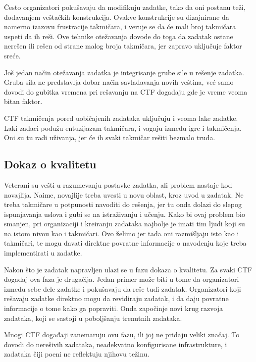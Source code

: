 \documentclass[12pt, a4paper, twocolumn]{article}
\begin{document}
Često organizatori pokušavaju da modifikuju zadatke, tako da oni postanu teži,
dodavanjem veštačkih konstrukcija. Ovakve konstrukcije su dizajnirane da 
namerno izazovu frustracije takmičara, i veruje se da će mali broj takmičara 
uspeti da ih reši. Ove tehnike otežavanja dovode do toga da zadatak ostane 
nerešen ili rešen od strane malog broja takmičara, jer zapravo uključuje 
faktor sreće. 

Još jedan način otežavanja zadatka je integrisanje grube sile u rešenje
zadatka. Gruba sila ne predstavlja dobar način savladavanja novih veština,
već samo dovodi do gubitka vremena pri rešavanju na CTF događaju gde je 
vreme veoma bitan faktor.

CTF takmičenja pored uobičajenih zadataka uključuju i veoma lake zadatke.
Laki zadaci podužu entuzijazam takmičara, i vagaju između igre i takmičenja. 
Oni su tu radi uživanja, jer će ih svaki takmičar rešiti bezmalo truda.

\subsection{Dokaz o kvalitetu}

Veterani su vešti u razumevanju postavke zadatka, ali problem nastaje kod 
novajlija. Naime, novajlije treba uvesti u novu oblast, kroz uvod u zadatak. 
Ne treba takmičare u potpunosti navoditi do rešenja, jer tu onda dolazi do 
slepog ispunjavanja uslova i gubi se na istraživanju i učenju. Kako bi ovaj 
problem bio smanjen, pri organizaciji i kreiranju zadataka najbolje je imati 
tim ljudi koji su na istom nivou kao i takmičari. Ovo želimo jer tada oni 
razmišljaju isto kao i takmičari, te mogu davati direktne povratne informacije 
o navođenju koje treba implementirati u zadatke. 

Nakon što je zadatak napravljen ulazi se u fazu dokaza o kvalitetu. Za
svaki CTF događaj ova faza je drugačija. Jedan primer može biti u tome
da organizatori između sebe dele zadatke i pokušavaju da reše tuđi zadatak.
Organizatori koji rešavaju zadatke direktno mogu da revidiraju zadatak, i
da daju povratne informacije o tome kako ga popraviti. Onda započinje novi
krug razvoja zadataka, koji se sastoji u poboljšanju trenutnih zadataka.

Mnogi CTF događaji zanemaruju ovu fazu, ili joj ne pridaju veliki značaj.
To dovodi do nerešivih zadataka, neadekvatno konfigurisane infrastrukture,
i zadataka čiji poeni ne reflektuju njihovu težinu.
\end{document}
